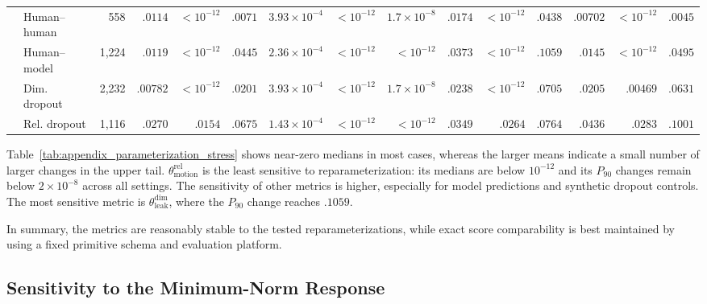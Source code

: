 \begin{table}[t]
{\begin{tabular}{@{}llr rrr rrr rrr rrr@{}}
        & Human--human & 558
        & $.0114$ & $<10^{-12}$ & $.0071$
        & $3.93{\times}10^{-4}$ & $<10^{-12}$ & $1.7{\times}10^{-8}$
        & $.0174$ & $<10^{-12}$ & $.0438$
        & $.00702$ & $<10^{-12}$ & $.0045$ \\

        & Human--model & 1,224
        & $.0119$ & $<10^{-12}$ & $.0445$
        & $2.36{\times}10^{-4}$ & $<10^{-12}$ & $<10^{-12}$
        & $.0373$ & $<10^{-12}$ & $.1059$
        & $.0145$ & $<10^{-12}$ & $.0495$ \\

        & Dim. dropout & 2,232
        & $.00782$ & $<10^{-12}$ & $.0201$
        & $3.93{\times}10^{-4}$ & $<10^{-12}$ & $1.7{\times}10^{-8}$
        & $.0238$ & $<10^{-12}$ & $.0705$
        & $.0205$ & $.00469$ & $.0631$ \\

        & Rel. dropout & 1,116
        & $.0270$ & $.0154$ & $.0675$
        & $1.43{\times}10^{-4}$ & $<10^{-12}$ & $<10^{-12}$
        & $.0349$ & $.0264$ & $.0764$
        & $.0436$ & $.0283$ & $.1001$ \\

        \bottomrule
    \end{tabular}%
    }
\end{table}

Table~\ref{tab:appendix_parameterization_stress} shows near-zero medians in most cases, whereas the larger means indicate a small number of larger changes in the upper tail.
$\theta_\mathrm{motion}^\mathrm{rel}$ is the least sensitive to reparameterization: its medians are below $10^{-12}$ and its $P_{90}$ changes remain below $2\times10^{-8}$ across all settings. The sensitivity of other metrics is higher, especially for model predictions and synthetic dropout controls. The most sensitive metric is $\theta_\mathrm{leak}^\mathrm{dim}$, where the $P_{90}$ change reaches $.1059$.

In summary, the metrics are reasonably stable to the tested
reparameterizations, while exact score comparability is best maintained
by using a fixed primitive schema and evaluation platform.


\subsection{Sensitivity to the Minimum-Norm Response}
\label{sec:appendix_pseudoinverse_sensitivity}

